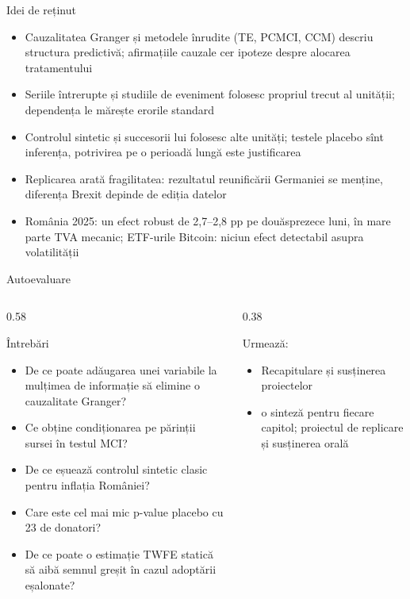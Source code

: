 \begin{frame}{Idei de reținut}
\itemsize{\small}
\begin{itemize}
    \item Cauzalitatea Granger și metodele înrudite (TE, PCMCI, CCM) descriu structura predictivă; afirmațiile cauzale cer ipoteze despre alocarea tratamentului
    \item Seriile întrerupte și studiile de eveniment folosesc propriul trecut al unității; dependența le mărește erorile standard
    \item Controlul sintetic și succesorii lui folosesc alte unități; testele placebo sînt inferența, potrivirea pe o perioadă lungă este justificarea
    \item Replicarea arată fragilitatea: rezultatul reunificării Germaniei se menține, diferența Brexit depinde de ediția datelor
    \item România 2025: un efect robust de 2{,}7--2{,}8 pp pe douăsprezece luni, în mare parte TVA mecanic; ETF-urile Bitcoin: niciun efect detectabil asupra volatilității
\end{itemize}
\end{frame}

\begin{frame}{Autoevaluare}
\itemsize{\small}
\begin{columns}[T]
\begin{column}{0.58\textwidth}
\begin{block}{Întrebări}
\begin{itemize}
    \item De ce poate adăugarea unei variabile la mulțimea de informație să elimine o cauzalitate Granger?
    \item Ce obține condiționarea pe părinții sursei în testul MCI?
    \item De ce eșuează controlul sintetic clasic pentru inflația României?
    \item Care este cel mai mic p-value placebo cu 23 de donatori?
    \item De ce poate o estimație TWFE statică să aibă semnul greșit în cazul adoptării eșalonate?
\end{itemize}
\end{block}
\end{column}
\begin{column}{0.38\textwidth}
\begin{block}{Urmează: }
\begin{itemize}
    \item Recapitulare și susținerea proiectelor
    \item o sinteză pentru fiecare capitol; proiectul de replicare și susținerea orală
\end{itemize}
\end{block}
\end{column}
\end{columns}
\end{frame}


